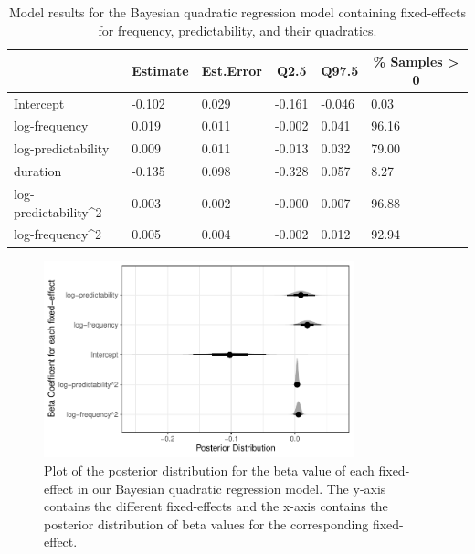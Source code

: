 \documentclass[
  authoryear,
  preprint,
  1p,
  onecolumn]{elsarticle}
\begin{document}
\begin{table}[H]

\begin{center}
\begin{threeparttable}

\caption{Model results for the Bayesian quadratic regression model containing fixed-effects for frequency, predictability, and their quadratics.}

\begin{tabular}{llllll}
\toprule
 & \multicolumn{1}{c}{Estimate} & \multicolumn{1}{c}{Est.Error} & \multicolumn{1}{c}{Q2.5} & \multicolumn{1}{c}{Q97.5} & \multicolumn{1}{c}{\% Samples > 0}\\
\midrule
Intercept & -0.102 & 0.029 & -0.161 & -0.046 & 0.03\\
log-frequency & 0.019 & 0.011 & -0.002 & 0.041 & 96.16\\
log-predictability & 0.009 & 0.011 & -0.013 & 0.032 & 79.00\\
duration & -0.135 & 0.098 & -0.328 & 0.057 & 8.27\\
log-predictability\textasciicircum{}2 & 0.003 & 0.002 & -0.000 & 0.007 & 96.88\\
log-frequency\textasciicircum{}2 & 0.005 & 0.004 & -0.002 & 0.012 & 92.94\\
\bottomrule
\end{tabular}

\end{threeparttable}
\end{center}

\end{table}

\begin{figure}[H]

{\centering \includegraphics[width=0.8\textwidth,height=\textheight]{quarto-writeup_files/figure-pdf/posteriorplotFullQuadratic-1.pdf}

}

\caption{Plot of the posterior distribution for the beta value of each
fixed-effect in our Bayesian quadratic regression model. The y-axis
contains the different fixed-effects and the x-axis contains the
posterior distribution of beta values for the corresponding
fixed-effect.}

\end{figure}%
\end{document}
